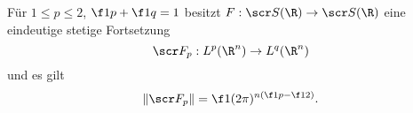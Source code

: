 \begin{nt} \label{4.31}
	Für $1 \le p \le 2$, $\f 1p + \f 1q = 1$ besitzt $F : \scr S(\R) \to \scr S(\R)$ eine eindeutige stetige Fortsetzung
	\[
		\scr F_p : L^p(\R^n) \to L^q(\R^n)
	\]
	und es gilt
	\[
		\| \scr F_p \| = \f 1{(2\pi)^{n(\f 1p-\f 12)}}.
	\]
\end{nt}
